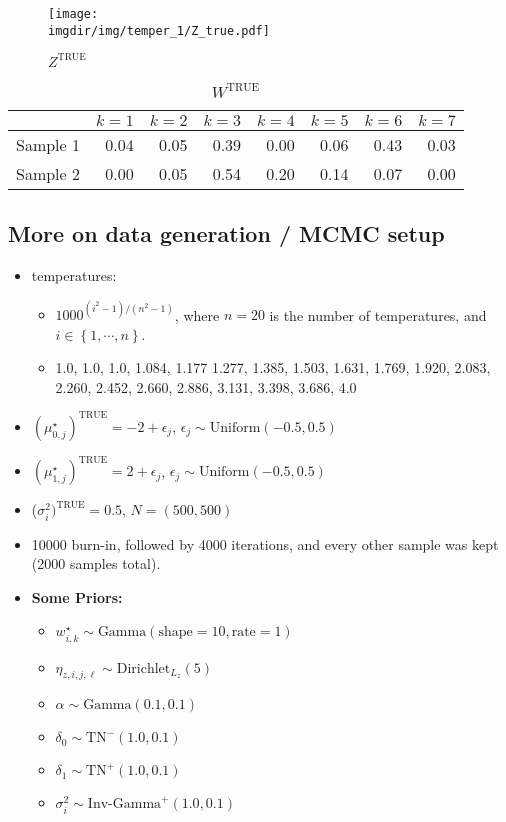 \documentclass[10pt]{article} %
\newcommand{\bc}[1]{ \left\{#1\right\} }
\newcommand{\Gam}{ \text{Gamma} }
\newcommand{\InvGamma}{ \text{Inv-Gamma} }
\newcommand{\Uniform}{ \text{Uniform} }
\def\Dir{\text{Dirichlet}}
\def\TN{\text{TN}}
\def\true{\text{TRUE}}
\def\imgdir{../../results/test-sim-6-7-3/maxtemp4-ntempts20-degree1-N500}
\begin{document}
\begin{figure}[H]
  \begin{center}  %
    \texttt{[image: \\imgdir/img/temper\_1/Z\_true.pdf]}
  \end{center}
  \caption{$Z^\true$}
  \label{fig:Z-true}
\end{figure}

\begin{table}[ht]
  \centering
  \begin{tabular}{rrrrrrrr}
    \hline
    & $k=1$ & $k=2$ & $k=3$ & $k=4$ & $k=5$ & $k=6$ & $k=7$ \\
    \hline
    Sample 1 & 0.04 & 0.05 & 0.39 & 0.00 & 0.06 & 0.43 & 0.03 \\
    Sample 2 & 0.00 & 0.05 & 0.54 & 0.20 & 0.14 & 0.07 & 0.00 \\
    \hline
  \end{tabular}
  \caption{$W^\true$}
  \label{tab:W-true}
\end{table}

\subsection{More on data generation / MCMC setup}
\begin{itemize}
  \item temperatures: 
    \begin{itemize}
      \item $1000^{(i^2 - 1) / (n^2 - 1)}$, where $n=20$ is the number of
        temperatures, and $i\in\bc{1,\cdots,n}$.
      \item 
        1.0, 1.0, 1.0, 1.084, 1.177
        1.277, 1.385, 1.503,
        1.631, 1.769, 1.920,
        2.083, 2.260, 2.452,
        2.660, 2.886, 3.131,
        3.398, 3.686, 4.0

    \end{itemize}
  \item $(\mu_{0,j}^\star)^\true=-2 + \epsilon_j$, $\epsilon_j \sim \Uniform(-0.5, 0.5)$
  \item $(\mu_{1,j}^\star)^\true=2 + \epsilon_j$, $\epsilon_j \sim \Uniform(-0.5, 0.5)$
  \item ($\sigma^2_i)^\true=0.5$, $N=(500, 500)$
  \item 10000 burn-in, followed by 4000 iterations, and every other sample was
    kept (2000 samples total).
  \item \textbf{Some Priors:}
  \begin{itemize}
    \item $w^\star_{i,k} \sim \Gam(\text{shape}=10, \text{rate}=1)$
    \item $\eta_{z, i,j,\ell} \sim \Dir_{L_z}(5)$
    \item $\alpha \sim \Gam(0.1, 0.1)$
    \item $\delta_0 \sim \TN^-(1.0, 0.1)$
    \item $\delta_1 \sim \TN^+(1.0, 0.1)$
    \item $\sigma^2_i \sim \InvGamma^+(1.0, 0.1)$
  \end{itemize}
\end{itemize}
\end{document}
